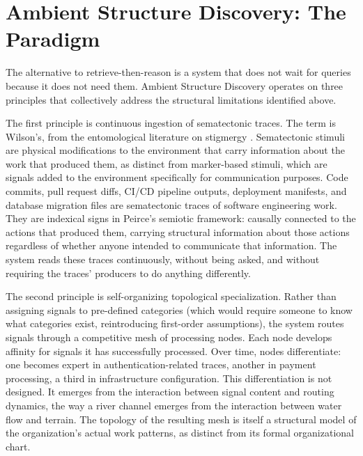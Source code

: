 \documentclass[11pt,a4paper]{article}
\begin{document}
\section{Ambient Structure Discovery: The Paradigm}
\label{sec:paradigm}

The alternative to retrieve-then-reason is a system that does not wait for queries because it does not need them. Ambient Structure Discovery operates on three principles that collectively address the structural limitations identified above.

The first principle is continuous ingestion of sematectonic traces. The term is Wilson's, from the entomological literature on stigmergy \citep{wilson1971}. Sematectonic stimuli are physical modifications to the environment that carry information about the work that produced them, as distinct from marker-based stimuli, which are signals added to the environment specifically for communication purposes. Code commits, pull request diffs, CI/CD pipeline outputs, deployment manifests, and database migration files are sematectonic traces of software engineering work. They are indexical signs in Peirce's semiotic framework: causally connected to the actions that produced them, carrying structural information about those actions regardless of whether anyone intended to communicate that information. The system reads these traces continuously, without being asked, and without requiring the traces' producers to do anything differently.

The second principle is self-organizing topological specialization. Rather than assigning signals to pre-defined categories (which would require someone to know what categories exist, reintroducing first-order assumptions), the system routes signals through a competitive mesh of processing nodes. Each node develops affinity for signals it has successfully processed. Over time, nodes differentiate: one becomes expert in authentication-related traces, another in payment processing, a third in infrastructure configuration. This differentiation is not designed. It emerges from the interaction between signal content and routing dynamics, the way a river channel emerges from the interaction between water flow and terrain. The topology of the resulting mesh is itself a structural model of the organization's actual work patterns, as distinct from its formal organizational chart.
\end{document}
